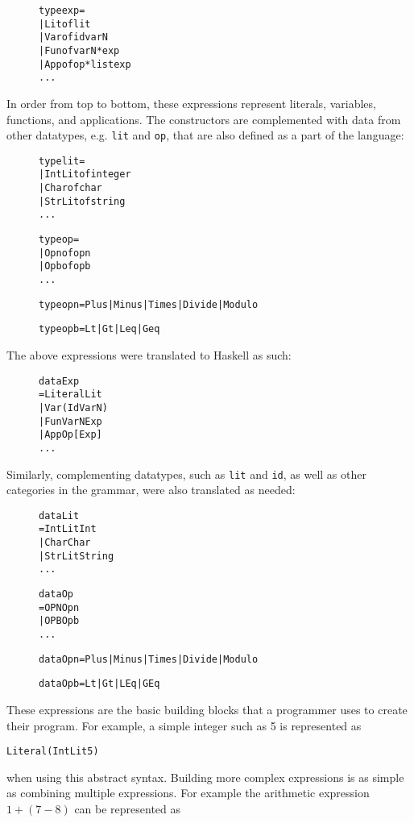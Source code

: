 \begin{figure}[H]
\begin{alltt}
  type exp =
    | Lit of lit
    | Var of id varN
    | Fun of varN * exp
    | App of op * list exp
    ...
\end{alltt}
\end{figure}

\noindent In order from top to bottom, these expressions represent literals,
variables, functions, and applications. The constructors are complemented with
data from other datatypes, e.g. \texttt{lit} and \texttt{op}, that are also
defined as a part of the language:
\begin{figure}[H]
\begin{alltt}
  type lit =
    | IntLit of integer
    | Char of char
    | StrLit of string
    ...

  type op =
    | Opn of opn
    | Opb of opb
    ...

  type opn = Plus | Minus | Times | Divide | Modulo

  type opb = Lt | Gt | Leq | Geq
\end{alltt}
\end{figure}

The above expressions were translated to Haskell as such:

\begin{figure}[H]
\begin{alltt}
  data Exp
    = Literal Lit
    | Var (Id VarN)
    | Fun VarN Exp
    | App Op [Exp]
    ...
\end{alltt}
\end{figure}

\noindent Similarly, complementing datatypes, such as \texttt{lit} and
\texttt{id}, as well as other categories in the grammar, were also translated
as needed:
\begin{figure}[H]
\begin{alltt}
  data Lit
    = IntLit Int
    | Char Char
    | StrLit String
    ...

  data Op
    = OPN Opn
    | OPB Opb
    ...

  data Opn = Plus | Minus | Times | Divide | Modulo

  data Opb = Lt | Gt | LEq | GEq
\end{alltt}
\end{figure}

These expressions are the basic building blocks that a programmer uses to create
their program. For example, a simple integer such as 5 is represented as
\begin{alltt}
  Literal (IntLit 5)
\end{alltt}
when using this abstract syntax. Building more
complex expressions is as simple as combining multiple expressions. For example
the arithmetic expression \(1 + (7 - 8)\) can be represented as

